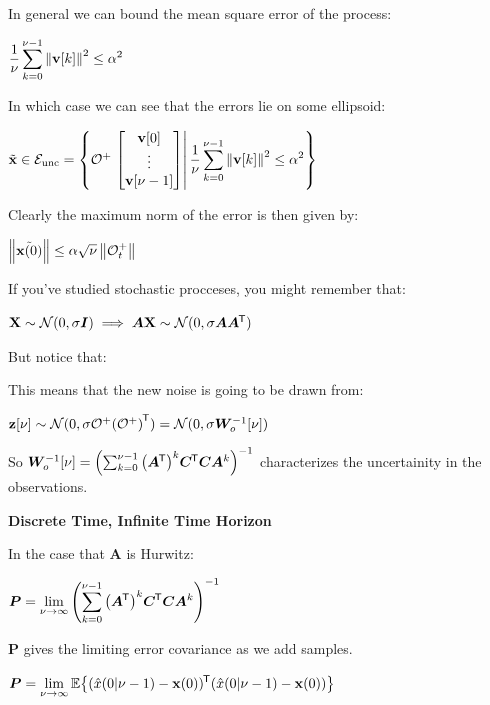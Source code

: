 \documentclass[11pt]{article}
\begin{document}
  In general we can bound the mean square error of the process:

  \(\dfrac{1}{\nu}\displaystyle\sum_{k = 0}^{\nu - 1}\left\lVert\mathbf{v}[k]\right\rVert^2 \le \alpha^2\)

  In which case we can see that the errors lie on some ellipsoid:

  \(\tilde{\mathbf{x}} \in \mathcal{E}_{\textrm{unc}} =
  {\left\{ \mathcal{O}^+
  \left.\begin{bmatrix}
    \mathbf{v}[0] \\
    \vdots \\
    \mathbf{v}[\nu - 1] \\
  \end{bmatrix} \right\vert \dfrac{1}{\nu}\displaystyle\sum_{k = 0}^{\nu - 1}\left\lVert\mathbf{v}[k]\right\rVert^2 \le \alpha^2 \right\}}\)

  Clearly the maximum norm of the error is then given by:

  \(\left\lVert\tilde{\mathbf{x}(0)}\right\rVert \le \alpha\sqrt{\nu}\left\lVert\mathcal{O}^+_t\right\rVert\)

  \pagebreak
  If you've studied stochastic procceses, you might remember that:

  \(\mathbf{X} \sim \mathcal{N}(0, \sigma\bm{I}) \implies \bm{A}\mathbf{X} \sim \mathcal{N}(0, \sigma\bm{A}\bm{A}^{\mkern-1.5mu\mathsf{T}})\)

  But notice that:

  This means that the new noise is going to be drawn from:

  \(\mathbf{z}[\nu] \sim \mathcal{N}(0, \sigma\mathcal{O}^+{\left( \mathcal{O}^+ \right)}^{\mkern-1.5mu\mathsf{T}}) = \mathcal{N}(0, \sigma\bm{W}_o^{-1}[\nu])\)

  So \(\bm{W}_o^{-1}[\nu] = {\left( \sum_{k = 0}^{\nu - 1} {\left( \bm{A}^{\mkern-1.5mu\mathsf{T}} \right)}^k\bm{C}^{\mkern-1.5mu\mathsf{T}}\bm{C}\bm{A}^k \right)}^{-1}\) characterizes
  the uncertainity in the observations.

  \vspace{12pt}

  \textbf{Discrete Time, Infinite Time Horizon}

  In the case that \(\bm{A}\) is Hurwitz:

  \(\bm{P} = \displaystyle \lim_{\nu \to \infty}
  {\left( \sum_{k = 0}^{\nu - 1} {\left( \bm{A}^{\mkern-1.5mu\mathsf{T}} \right)}^k\bm{C}^{\mkern-1.5mu\mathsf{T}}\bm{C}\bm{A}^k \right)}^{-1} \)

  \(\bm{P}\) gives the limiting error covariance as we add samples.

  \(\bm{P} = \displaystyle
  \lim_{\nu \to \infty}\mathbb{E}{\left\{ (\hat{x}(0 | \nu - 1) - \mathbf{x}(0))^{\mkern-1.5mu\mathsf{T}}(\hat{x}(0 | \nu - 1) - \mathbf{x}(0)) \right\}}\)
\end{document}
